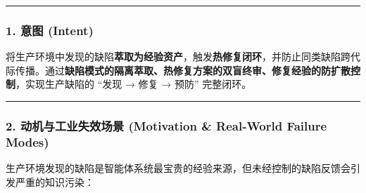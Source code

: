 \begin{center}\rule{0.5\linewidth}{0.5pt}\end{center}

\subsubsection{1. 意图 (Intent)}\label{ux610fux56fe-intent-23}

将生产环境中发现的缺陷\textbf{萃取为经验资产}，触发\textbf{热修复闭环}，并防止同类缺陷跨代际传播。通过\textbf{缺陷模式的隔离萃取、热修复方案的双盲终审、修复经验的防扩散控制}，实现生产缺陷的
``发现 → 修复 → 预防'' 完整闭环。

\begin{center}\rule{0.5\linewidth}{0.5pt}\end{center}

\subsubsection{2. 动机与工业失效场景 (Motivation \& Real-World Failure
Modes)}\label{ux52a8ux673aux4e0eux5de5ux4e1aux5931ux6548ux573aux666f-motivation-real-world-failure-modes-23}

生产环境发现的缺陷是智能体系统最宝贵的经验来源，但未经控制的缺陷反馈会引发严重的知识污染：

